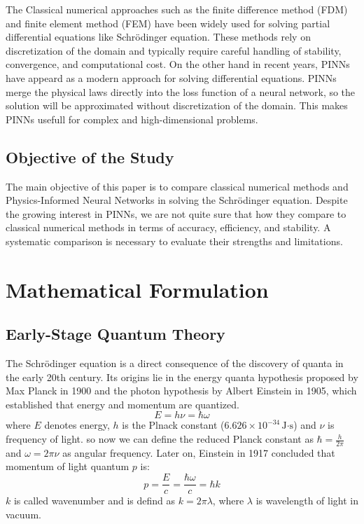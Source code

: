 \documentclass[11pt]{article}
\begin{document}
The Classical numerical approaches such as the finite difference method (FDM) and finite element method (FEM) have been widely used for solving partial differential equations like Schrödinger equation. These methods rely on discretization of the domain and typically require careful handling of stability, convergence, and computational cost. On the other hand in recent years, PINNs have appeard as a modern approach for solving differential equations. PINNs merge the physical laws directly into the loss function of a neural network, so the solution will be approximated without discretization of the domain. This makes PINNs usefull for complex and high-dimensional problems.

\subsection{Objective of the Study}
The main objective of this paper is to compare classical numerical methods and Physics-Informed Neural Networks in solving the Schrödinger equation. Despite the growing interest in PINNs, we are not quite sure that how they compare to classical numerical methods in terms of accuracy, efficiency, and stability. A systematic comparison is necessary to evaluate their strengths and limitations.

\section{Mathematical Formulation}
\subsection{Early-Stage Quantum Theory}
The Schrödinger equation is a direct consequence of the discovery of quanta in the early 20th century. Its origins lie in the energy quanta hypothesis proposed by Max Planck in 1900 and the photon hypothesis by Albert Einstein in 1905, which established that energy and momentum are quantized.
\begin{equation}  \label{eq:1905}
	E = h \nu = \hbar \omega
\end{equation} 
where $E$ denotes energy, $h$ is the Plnack constant ($6.626 \times 10^{-34} \,\text{J·s}$) and $\nu$ is frequency of light. so now we can define the reduced Planck constant as $\hbar = \frac{h}{2 \pi}$ and $\omega = 2 \pi \nu$ as angular frequency. 
Later on, Einstein in 1917 concluded that momentum of light quantum $p$ is:
\begin{equation}  \label{eq:1917}
	 p = \frac{E}{c} = \frac{\hbar \omega}{c} = \hbar k 
\end{equation}
$k$ is called wavenumber and is defind as $ k = 2 \pi \lambda$, where $\lambda$ is wavelength of light in vacuum.
\end{document}
